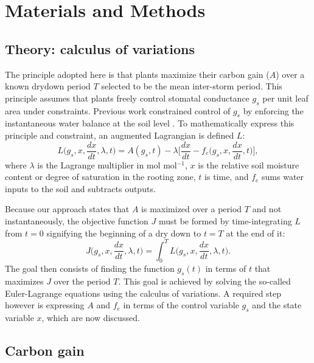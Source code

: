 \documentclass[utf8]{frontiersSCNS} %
\begin{document}
\section{Materials and Methods}

\subsection{Theory: calculus of variations}

The principle adopted here is that plants maximize their carbon gain ($A$) over a known drydown period $T$ selected to be the mean inter-storm period. This principle assumes that plants freely control stomatal conductance $g_s$ per unit leaf area under constraints. Previous work constrained control of $g_s$ by enforcing the instantaneous water balance at the soil level \citep{manzoni_optimization_2013}. To mathematically express this principle and constraint, an augmented Lagrangian is defined $L$:
\begin{equation}
    \label{eqn:Lagrangian}
    L\Big(g_s, x, \frac{dx}{dt}, \lambda, t\Big) = A(g_s, t) - \lambda \Bigg[ \frac{dx}{dt} - f_e\Big(g_s, x, \frac{dx}{dt}, t\Big)\Bigg],
\end{equation}
where $\lambda$ is the Lagrange multiplier in mol mol$^{-1}$, $x$ is the relative soil moisture content or degree of saturation in the rooting zone, $t$ is time, and $f_e$ sums water inputs to the soil and subtracts outputs.

Because our approach states that $A$ is maximized over a period $T$ and not instantaneously, the objective function $J$ must be formed by time-integrating $L$ from $t=0$ signifying the beginning of a dry down to $t=T$ at the end of it:
\begin{equation}
    \label{eqn:Objective}
    J\Big(g_s, x, \frac{dx}{dt}, \lambda, t\Big) = \int_0^T L\Big(g_s, x, \frac{dx}{dt}, \lambda, t\Big).
\end{equation}
The goal then consists of finding the function $g_s(t)$ in terms of $t$ that maximizes $J$ over the period $T$. This goal is achieved by solving the so-called Euler-Lagrange equations using the calculus of variations. A required step however is expressing $A$ and $f_e$ in terms of the control variable $g_s$ and the state variable $x$, which are now discussed.

\subsection{Carbon gain}
\end{document}
